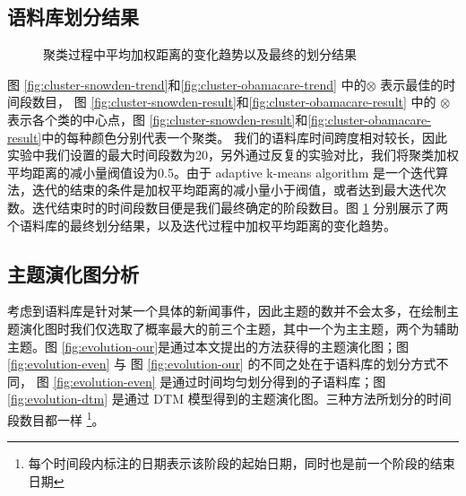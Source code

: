 \subsection{语料库划分结果}
\label{sec:ada-kmeans-result}
\begin{figure}[htb]
	\centering

	\caption{聚类过程中平均加权距离的变化趋势以及最终的划分结果}
	\label{fig:cluster}
\end{figure}
图 \ref{fig:cluster-snowden-trend}和\ref{fig:cluster-obamacare-trend} 中的$\otimes$ 表示最佳的时间段数目， 图 \ref{fig:cluster-snowden-result}和\ref{fig:cluster-obamacare-result} 中的 $\otimes$表示各个类的中心点，图 \ref{fig:cluster-snowden-result}和\ref{fig:cluster-obamacare-result}中的每种颜色分别代表一个聚类。
我们的语料库时间跨度相对较长，因此实验中我们设置的最大时间段数为20，另外通过反复的实验对比，我们将聚类加权平均距离的减小量阀值设为0.5。由于 adaptive k-means algorithm 是一个迭代算法，迭代的结束的条件是加权平均距离的减小量小于阀值，或者达到最大迭代次数。迭代结束时的时间段数目便是我们最终确定的阶段数目。图 \ref{fig:cluster} 分别展示了两个语料库的最终划分结果，以及迭代过程中加权平均距离的变化趋势。

\subsection{主题演化图分析}
\label{sec:evolution-map}
考虑到语料库是针对某一个具体的新闻事件，因此主题的数并不会太多，在绘制主题演化图时我们仅选取了概率最大的前三个主题，其中一个为主主题，两个为辅助主题。图 \ref{fig:evolution-our}是通过本文提出的方法获得的主题演化图；图 \ref{fig:evolution-even} 与 图 \ref{fig:evolution-our} 的不同之处在于语料库的划分方式不同， 图 \ref{fig:evolution-even}  是通过时间均匀划分得到的子语料库；图 \ref{fig:evolution-dtm} 是通过 DTM 模型得到的主题演化图。三种方法所划分的时间段数目都一样 \footnote{每个时间段内标注的日期表示该阶段的起始日期，同时也是前一个阶段的结束日期}。

